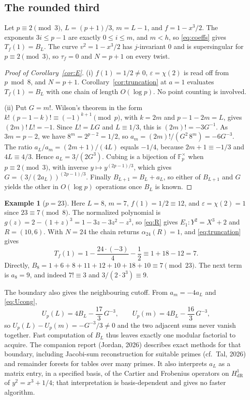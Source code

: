 \documentclass[11pt,a4paper]{article}
\numberwithin{equation}{section}
\theoremstyle{plain}
\theoremstyle{definition}
\newtheorem{example}[theorem]{Example}
\newcommand{\F}{\mathbb{F}}
\newcommand{\eps}{\varepsilon}
\begin{document}
\subsection{The rounded third}
Let $p\equiv2\pmod 3$, $L=(p+1)/3$, $m=L-1$, and $f=1-x^3/2$. The exponents $3i\le p-1$ are exactly $0\le i\le m$, and $m<h$, so \eqref{eq:coeffs} gives $T_f(1)=B_L$. The curve $v^2=1-x^3/2$ has $j$-invariant $0$ and is supersingular for $p\equiv2\pmod3$, so $\tau_f=0$ and $N=p+1$ on every twist.

\begin{proof}[Proof of Corollary~\ref{cor:E}]
(i) $f(1)=1/2\neq0$, $\eps=\chi(2)$ is read off from $p\bmod8$, and $N=p+1$. Corollary~\ref{cor:truncation} at $a=1$ evaluates $T_f(1)=B_L$ with one chain of length $O(\log p)$. No point counting is involved.

(ii) Put $G=m!$. Wilson's theorem in the form $k!\,(p-1-k)!\equiv(-1)^{k+1}\pmod p$, with $k=2m$ and $p-1-2m=L$, gives $(2m)!\,L!=-1$. Since $L!=LG$ and $L\equiv1/3$, this is $(2m)!=-3G^{-1}$. As $3m=p-2$, we have $8^m=2^{p-2}=1/2$, so $a_m=(2m)!/(G^2\,8^m)=-6G^{-3}$. The ratio $a_L/a_m=(2m+1)/(4L)$ equals $-1/4$, because $2m+1\equiv-1/3$ and $4L\equiv4/3$. Hence $a_L=3/(2G^3)$. Cubing is a bijection of $\F_p^\times$ when $p\equiv2\pmod3$, with inverse $y\mapsto y^{(2p-1)/3}$, which gives $G=(3/(2a_L))^{(2p-1)/3}$. Finally $B_{L+1}=B_L+a_L$, so either of $B_{L+1}$ and $G$ yields the other in $O(\log p)$ operations once $B_L$ is known.
\end{proof}

\begin{example}[$p=23$]\label{ex:23}
Here $L=8$, $m=7$, $f(1)=1/2\equiv12$, and $\eps=\chi(2)=1$ since $23\equiv7\pmod8$. The normalized polynomial is $g(z)=2-(1+z)^3=1-3z-3z^2-z^3$, so \eqref{eq:R} gives $E_1:Y^2=X^3+2$ and $R=(10,6)$. With $N=24$ the chain returns $\alpha_{24}(R)=1$, and \eqref{eq:truncation} gives
\[
T_f(1)=1-\frac{24\cdot(-3)}{4}-\frac12\equiv1+18-12=7 .
\]
Directly, $B_8=1+6+8+11+12+10+18+10\equiv7\pmod{23}$. The next term is $a_8=9$, and indeed $7!\equiv3$ and $3/(2\cdot3^3)\equiv9$.
\end{example}

The boundary also gives the neighbouring cutoff. From $a_m=-4a_L$ and \eqref{eq:Ucong},
\begin{equation}\label{eq:rt-U}
U_p(L)=4B_L-\frac{17}{3}\,G^{-3},\qquad U_p(m)=4B_L-\frac{16}{3}\,G^{-3},
\end{equation}
so $U_p(L)-U_p(m)=-G^{-3}/3\neq0$ and the two adjacent sums never vanish together. Fast computation of $B_L$ thus leaves exactly one modular factorial to acquire. The companion report (Jordan, 2026) describes exact methods for that boundary, including Jacobi-sum reconstruction for suitable primes (cf.\ Tal, 2026) and remainder forests for tables over many primes. It also interprets $a_L$ as a matrix entry, in a specified basis, of the Cartier and Frobenius operators on $H^1_{\mathrm{dR}}$ of $y^2=x^3+1/4$; that interpretation is basis-dependent and gives no faster algorithm.
\end{document}

